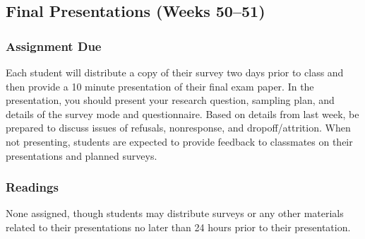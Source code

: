 \documentclass[11pt,a4paper]{article}
\begin{document}
\clearpage
\subsection{Final Presentations (Weeks 50--51)}
\vspace{1em}
\subsubsection*{Assignment Due}
Each student will distribute a copy of their survey two days prior to class and then provide a 10 minute presentation of their final exam paper. In the presentation, you should present your research question, sampling plan, and details of the survey mode and questionnaire. Based on details from last week, be prepared to discuss issues of refusals, nonresponse, and dropoff/attrition. When not presenting, students are expected to provide feedback to classmates on their presentations and planned surveys.

\subsubsection*{Readings}
None assigned, though students may distribute surveys or any other materials related to their presentations no later than 24 hours prior to their presentation.




\end{document}
